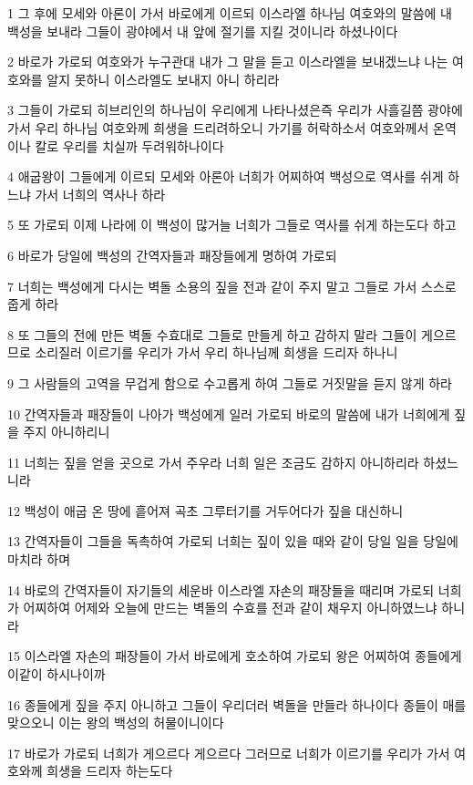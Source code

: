 \par 1 그 후에 모세와 아론이 가서 바로에게 이르되 이스라엘 하나님 여호와의 말씀에 내 백성을 보내라 그들이 광야에서 내 앞에 절기를 지킬 것이니라 하셨나이다
\par 2 바로가 가로되 여호와가 누구관대 내가 그 말을 듣고 이스라엘을 보내겠느냐 나는 여호와를 알지 못하니 이스라엘도 보내지 아니 하리라
\par 3 그들이 가로되 히브리인의 하나님이 우리에게 나타나셨은즉 우리가 사흘길쯤 광야에 가서 우리 하나님 여호와께 희생을 드리려하오니 가기를 허락하소서 여호와께서 온역이나 칼로 우리를 치실까 두려워하나이다
\par 4 애굽왕이 그들에게 이르되 모세와 아론아 너희가 어찌하여 백성으로 역사를 쉬게 하느냐 가서 너희의 역사나 하라
\par 5 또 가로되 이제 나라에 이 백성이 많거늘 너희가 그들로 역사를 쉬게 하는도다 하고
\par 6 바로가 당일에 백성의 간역자들과 패장들에게 명하여 가로되
\par 7 너희는 백성에게 다시는 벽돌 소용의 짚을 전과 같이 주지 말고 그들로 가서 스스로 줍게 하라
\par 8 또 그들의 전에 만든 벽돌 수효대로 그들로 만들게 하고 감하지 말라 그들이 게으르므로 소리질러 이르기를 우리가 가서 우리 하나님께 희생을 드리자 하나니
\par 9 그 사람들의 고역을 무겁게 함으로 수고롭게 하여 그들로 거짓말을 듣지 않게 하라
\par 10 간역자들과 패장들이 나아가 백성에게 일러 가로되 바로의 말씀에 내가 너희에게 짚을 주지 아니하리니
\par 11 너희는 짚을 얻을 곳으로 가서 주우라 너희 일은 조금도 감하지 아니하리라 하셨느니라
\par 12 백성이 애굽 온 땅에 흩어져 곡초 그루터기를 거두어다가 짚을 대신하니
\par 13 간역자들이 그들을 독촉하여 가로되 너희는 짚이 있을 때와 같이 당일 일을 당일에 마치라 하며
\par 14 바로의 간역자들이 자기들의 세운바 이스라엘 자손의 패장들을 때리며 가로되 너희가 어찌하여 어제와 오늘에 만드는 벽돌의 수효를 전과 같이 채우지 아니하였느냐 하니라
\par 15 이스라엘 자손의 패장들이 가서 바로에게 호소하여 가로되 왕은 어찌하여 종들에게 이같이 하시나이까
\par 16 종들에게 짚을 주지 아니하고 그들이 우리더러 벽돌을 만들라 하나이다 종들이 매를 맞으오니 이는 왕의 백성의 허물이니이다
\par 17 바로가 가로되 너희가 게으르다 게으르다 그러므로 너희가 이르기를 우리가 가서 여호와께 희생을 드리자 하는도다
